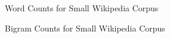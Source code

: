 \begin{figure}[h!]
\centering
\label{fig:wc}
\caption{Word Counts for Small Wikipedia Corpus}
\end{figure}

\begin{figure}[h!]
\centering
\label{fig:bigram}
\caption{Bigram Counts for Small Wikipedia Corpus}
\end{figure}

